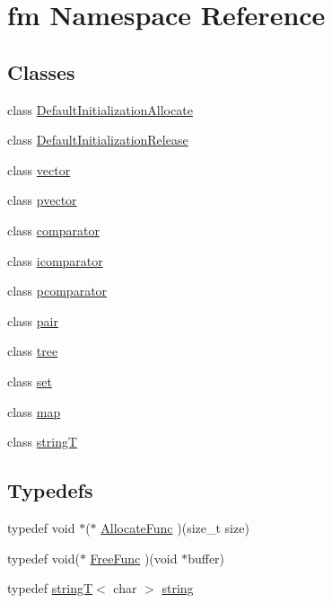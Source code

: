 \hypertarget{namespacefm}{
\section{fm Namespace Reference}
\label{namespacefm}
}
\subsection*{Classes}
\begin{DoxyCompactItemize}
\item 
class \hyperlink{classfm_1_1DefaultInitializationAllocate}{DefaultInitializationAllocate}
\item 
class \hyperlink{classfm_1_1DefaultInitializationRelease}{DefaultInitializationRelease}
\item 
class \hyperlink{classfm_1_1vector}{vector}
\item 
class \hyperlink{classfm_1_1pvector}{pvector}
\item 
class \hyperlink{classfm_1_1comparator}{comparator}
\item 
class \hyperlink{classfm_1_1icomparator}{icomparator}
\item 
class \hyperlink{classfm_1_1pcomparator}{pcomparator}
\item 
class \hyperlink{classfm_1_1pair}{pair}
\item 
class \hyperlink{classfm_1_1tree}{tree}
\item 
class \hyperlink{classfm_1_1set}{set}
\item 
class \hyperlink{classfm_1_1map}{map}
\item 
class \hyperlink{classfm_1_1stringT}{stringT}
\end{DoxyCompactItemize}
\subsection*{Typedefs}
\begin{DoxyCompactItemize}
\item 
typedef void $\ast$($\ast$ \hyperlink{namespacefm_a97324e93febfca76d5ed574a89c0197d}{AllocateFunc} )(size\_\-t size)
\item 
typedef void($\ast$ \hyperlink{namespacefm_a9b240a6540d27367231e6fd6d93ec35c}{FreeFunc} )(void $\ast$buffer)
\item 
typedef \hyperlink{classfm_1_1stringT}{stringT}$<$ char $>$ \hyperlink{namespacefm_ac112eb8f56d62ea729aa6d1edd7233a4}{string}
\end{DoxyCompactItemize}
